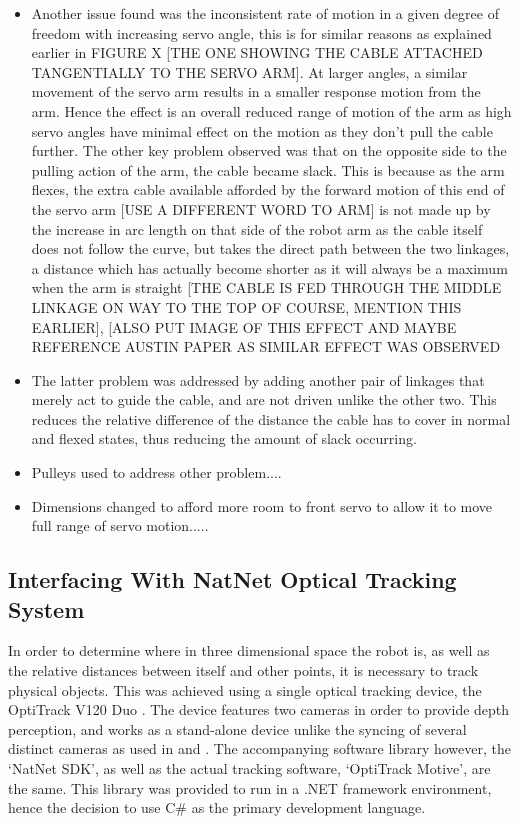 \documentclass[11pt]{article}
\begin{document}
\begin{itemize}
\item{Another issue found was the inconsistent rate of motion in a given degree of freedom with increasing servo angle, this is for similar reasons as explained earlier in FIGURE X [THE ONE SHOWING THE CABLE ATTACHED TANGENTIALLY TO THE SERVO ARM]. At larger angles, a similar movement of the servo arm results in a smaller response motion from the arm. Hence the effect is an overall reduced range of motion of the arm as high servo angles have minimal effect on the motion as they don't pull the cable further. The other key problem observed was that on the opposite side to the pulling action of the arm, the cable became slack. This is because as the arm flexes, the extra cable available afforded by the forward motion of this end of the servo arm [USE A DIFFERENT WORD TO ARM] is not made up by the increase in arc length on that side of the robot arm  as the cable itself does not follow the curve, but takes the  direct path between the two linkages, a distance which has actually become shorter as it will always be a maximum when the arm is straight [THE CABLE IS FED THROUGH THE MIDDLE LINKAGE ON WAY TO THE TOP OF COURSE, MENTION THIS EARLIER], [ALSO PUT IMAGE OF THIS EFFECT AND MAYBE REFERENCE AUSTIN PAPER AS SIMILAR EFFECT WAS OBSERVED}
\item{The latter problem was addressed by adding another pair of linkages that merely act to guide the cable, and are not driven unlike the other two. This reduces the relative difference of the distance the cable has to cover in normal and flexed states, thus reducing the amount of slack occurring.}
\item{Pulleys used to address other problem....}
\item{Dimensions changed to afford more room to front servo to allow it to move full range of servo motion.....} 
\end{itemize}
\subsection{Interfacing With NatNet Optical Tracking System}

In order to determine where in three dimensional space the robot is, as well as the relative distances between itself and other points, it is necessary to track physical objects. This was achieved using a single optical tracking device, the OptiTrack V120 Duo \cite{OptiTrackSite}. The device features two cameras in order to provide depth perception, and works as a stand-alone device unlike the syncing of several distinct cameras as used in \cite{GreggSmithDesign} and \cite{GreggSmithFeedback}. The accompanying software library however, the `NatNet SDK', as well as the actual tracking software, `OptiTrack Motive', are the same. This library was provided to run in a .NET framework environment, hence the decision to use C\# as the primary development language.
\end{document}
